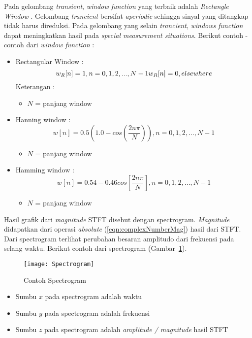 	Pada gelombang {\it transient}, {\it window function} yang terbaik adalah {\it Rectangle Window} \cite{hp:10:hp}. Gelombang {\it trancient} bersifat {\it aperiodic} sehingga sinyal yang ditangkap tidak harus direduksi. Pada gelombang yang selain {\it trancient}, {\it windows function} dapat meningkatkan hasil pada {\it special measurement situations}. Berikut contoh - contoh dari {\it window function} \cite{yiwen:0:stft} :
	\begin{itemize}
		\item Rectangular Window :
			\begin{equation}\label{eqn:rectW}
				w_R[n]= 1 ,n = 0,1,2,..., N -1 \\
				w_R[n]= 0 , elsewhere
			\end{equation}
			Keterangan : \\
			\begin{itemize}
				\item $N$ = panjang window
			\end{itemize}
		\item Hanning window :
			\begin{equation}\label{eqn:hannW}
				w[n]= 0.5 (1.0 - cos(\frac{2n\pi}{N})) , n = 0, 1, 2, ... , N-1
			\end{equation}
			\begin{itemize}
				\item $N$ = panjang window
			\end{itemize}
		\item Hamming window :
			\begin{equation}\label{eqn:hammW}
				w[n]= 0.54 - 0.46cos[\frac{2n\pi}{N}] , n = 0, 1, 2, ... , N-1
			\end{equation}
			\begin{itemize}
				\item $N$ = panjang window
			\end{itemize}
	\end{itemize}

Hasil grafik dari {\it magnitude} STFT disebut dengan spectrogram. {\it Magnitude} didapatkan dari operasi {\it absolute} (\ref{eqn:complexNumberMag}) hasil dari STFT. Dari spectrogram terlihat perubahan besaran amplitudo dari frekuensi pada selang waktu. 
 Berikut contoh dari spectrogram (Gambar~\ref{fig:Spectrogramcth}).

\begin{figure} [H]
	\centering  
	\texttt{[image: Spectrogram]}  
	\caption[Contoh Spectrogram]{Contoh Spectrogram} 
	\label{fig:Spectrogramcth} 
\end{figure}
\begin{itemize}
	\item Sumbu $x$ pada spectrogram adalah waktu
	\item Sumbu $y$ pada spectrogram adalah frekuensi
	\item Sumbu $z$ pada spectrogram adalah {\it amplitude / magnitude} hasil STFT
\end{itemize}

